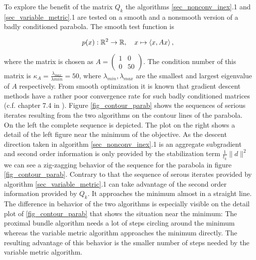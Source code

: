 
To explore the benefit of the matrix \(Q_k\) the algorithms \ref{sec_nonconv_inex}.1 and \ref{sec_variable_metric}.1 are tested on a smooth and a nonsmooth version of a badly conditioned parabola.
The smooth test function is

\[p(x): \mathbb{R}^2 \to \mathbb{R}, \quad x \mapsto \left\langle x, Ax \right\rangle,\]

where the matrix is chosen as \(A = \begin{pmatrix} 1&0 \\ 0&50\end{pmatrix}\). The condition number of this matrix is \(\kappa_A = \frac{\lambda_{max}}{\lambda{min}} = 50\), where \(\lambda_{min}, \lambda_{max}\) are the smallest and largest eigenvalue of \(A\) respectively. From smooth optimization it is known that gradient descent methods have a rather poor convergence rate for such badly conditioned matrices (c.f. chapter 7.4 in \cite{Ulbrich2012}).
Figure \ref{fig_contour_parab} shows the sequences of serious iterates resulting from the two algorithms on the contour lines of the parabola. On the left the complete sequence is depicted. The plot on the right shows a detail of the left figure near the minimum of the objective.
As the descent direction taken in algorithm \ref{sec_nonconv_inex}.1 is an aggregate subgradient and second order information is only provided by the stabilization term \(\frac{1}{t_k}\|d\|^2\) we can see a zig-zagging behavior of the sequence for the parabola in figure \ref{fig_contour_parab}.
Contrary to that the sequence of serous iterates provided by algorithm \ref{sec_variable_metric}.1 can take advantage of the second order information provided by \(Q_k\).
It approaches the minimum almost in a straight line. The difference in behavior of the two algorithms is especially visible on the detail plot of \ref{fig_contour_parab} that shows the situation near the minimum: The proximal bundle algorithm needs a lot of steps circling around the minimum whereas the variable metric algorithm approaches the minimum directly. The resulting advantage of this behavior is the smaller number of steps needed by the variable metric algorithm. 



